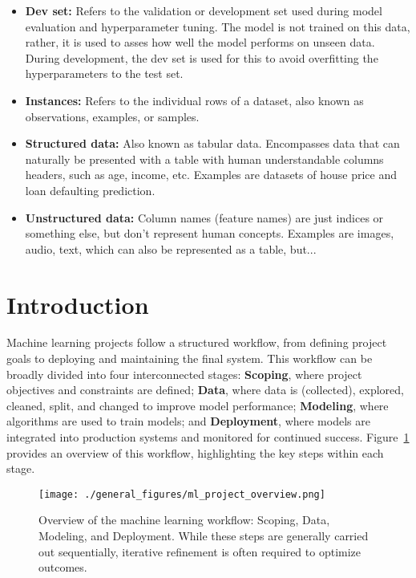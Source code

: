 \documentclass[12pt,openany]{book}
\begin{document}
\begin{itemize}
    \item \textbf{Dev set:} Refers to the validation or development set used during model evaluation and hyperparameter tuning. The model is not trained on this data, rather, it is used to asses how well the model performs on unseen data. During development, the dev set is used for this to avoid overfitting the hyperparameters to the test set.
    \item \textbf{Instances:} Refers to the individual rows of a dataset, also known as observations, examples, or samples. 
    \item \textbf{Structured data:} Also known as tabular data. Encompasses data that can naturally be presented with a table with human understandable columns headers, such as age, income, etc. Examples are datasets of house price and loan defaulting prediction.
    \item \textbf{Unstructured data:} Column names (feature names) are just indices or something else, but don't represent human concepts. Examples are images, audio, text, which can also be represented as a table, but...
\end{itemize}


\section{Introduction}

Machine learning projects follow a structured workflow, from defining project goals to deploying and maintaining the final system. This workflow can be broadly divided into four interconnected stages: \textbf{Scoping}, where project objectives and constraints are defined; \textbf{Data}, where data is (collected), explored, cleaned, split, and changed to improve model performance; \textbf{Modeling}, where algorithms are used to train models; and \textbf{Deployment}, where models are integrated into production systems and monitored for continued success. Figure~\ref{fig:ml_project_overview} provides an overview of this workflow, highlighting the key steps within each stage.

\begin{figure}[H]
    \centering
    \texttt{[image: ./general\_figures/ml\_project\_overview.png]}
    \caption{Overview of the machine learning workflow: Scoping, Data, Modeling, and Deployment. While these steps are generally carried out sequentially, iterative refinement is often required to optimize outcomes.}
    \label{fig:ml_project_overview}
\end{figure}
\end{document}
